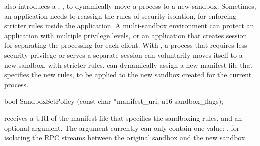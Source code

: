 \Thehostabi{} also introduces a \hostapi{}, ,
to dynamically move a process to a new sandbox.
Sometimes, an application needs to reassign the rules of security isolation,
for enforcing stricter rules inside the application.
A multi-sandbox environment can protect an application with multiple privilege levels, or an application that creates session for separating the processing for each client.
With , a process that requires less security privilege
or serves a separate session can voluntarily moves itself to a new sandbox,
with stricter rules.
 can dynamically
assign a new manifest file that specifies the new rules,
to be applied to the
new sandbox created for the current process.







\begin{paldef}
bool SandboxSetPolicy (const char *manifest_uri,
                       u16 sandbox_flags);
\end{paldef}


 receives a URI of the manifest file that specifies the sandboxing rules,
and an optional  argument.
The  argument currently can only contain one value:
, for isolating the RPC streams between the original sandbox and the new sandbox.

